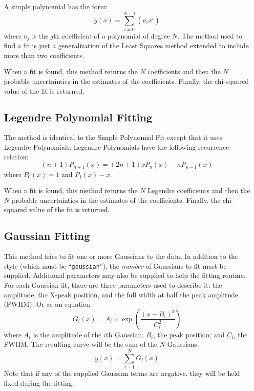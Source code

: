 A simple polynomial has the form:
\[ y(x) = \sum_{i=0}^{N-1} \left(a_{i} x^{i}\right) \]
where $a_{j}$ is the $j$th coefficient of a polynomial of degree $N$.
The method used to find a fit is just a generalization of the Least
Squares method extended to include more than two coefficients.

When a fit is found, this method returns the $N$ coefficients and then
the $N$ probable uncertainties in the estimates of the coefficients.
Finally, the chi-squared value of the fit is returned.

\subsection*{Legendre Polynomial Fitting}

The method is identical to the Simple Polynomial Fit except that it uses
Legendre Polynomials.
Legendre Polynomials have the following recurrence relation:
\[ (n + 1)P_{n + 1}(x) = (2n + 1)xP_n(x) - nP_{n - 1}(x) \]
where $P_0(x) = 1$ and $P_1(x) - x$.

When a fit is found, this method returns the $N$ Legendre coefficients
and then the $N$ probable uncertainties in the estimates of the coefficients.
Finally, the chi-squared value of the fit is returned.

\subsection*{Gaussian Fitting}

This method tries to fit one or more Gaussians to the data.
In addition to the style (which must be ``{\tt gaussian}''),
the {\em number} of Gaussians to fit must be supplied.
Additional parameters may also be supplied to help the fitting routine.
For each Gaussian fit, there are three parameters used to describe it:
the amplitude, the X-peak position, and the full width at half the peak
amplitude (FWHM).
Or as an equation:
\[ G_{i}(x)=A_i\times\exp\left(\frac{\left(x-B_{i}\right)^2}{C_{i}^2}\right) \]
where $A_i$ is the amplitude of the $i$th Gaussian;
$B_i$, the peak position;
and $C_i$, the FWHM.
The resulting curve will be the sum of the $N$ Gaussians:
\[ y(x) = \sum_{i=1}^{N} G_{i}(x) \]
Note that if any of the supplied Gaussian terms are negative,
they will be held fixed during the fitting.

